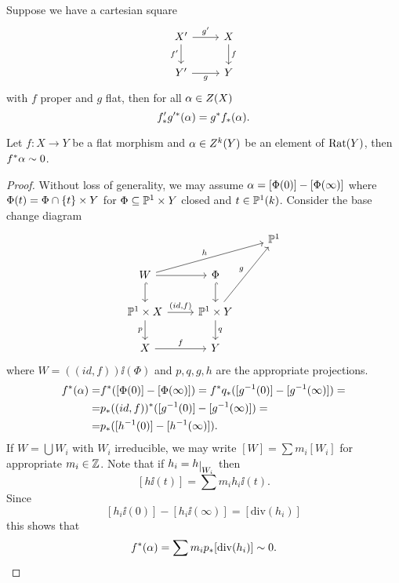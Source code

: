 \begin{proposition}[]
Suppose we have a cartesian square
\[\begin{tikzcd}
	{X'} & X \\
	{Y'} & Y
	\arrow["{g'}", from=1-1, to=1-2]
	\arrow["{f'}"', from=1-1, to=2-1]
	\arrow["f", from=1-2, to=2-2]
	\arrow["g"', from=2-1, to=2-2]
\end{tikzcd}\]
with $f$ proper and $g$ flat, then for all $\alpha\in Z(X)$
\[f_\ast'g'^\ast(\alpha)=g^\ast f_\ast(\alpha).\]
\end{proposition}


\begin{proposition}[]
Let $f:X\to Y$ be a flat morphism and $\alpha\in Z^k(Y)$ be an element of $\mathrm{Rat}(Y)$, then $f^\ast\alpha\sim 0$.
\end{proposition}
\begin{proof}
Without loss of generality, we may assume $\alpha=[\Phi(0)]-[\Phi(\infty)]$ where $\Phi(t)=\Phi\cap \left\{{t}\right\}\times Y$ for $\Phi\subseteq \mathbb{P}^1\times Y$ closed and $t\in \mathbb{P}^1(k)$.
Consider the base change diagram
\[\begin{tikzcd}
	&& {\Pj^1} \\
	W & \Phi \\
	{\Pj^1\times X} & {\Pj^1\times Y} \\
	X & Y
	\arrow["h", from=2-1, to=1-3]
	\arrow[from=2-1, to=2-2]
	\arrow[hook, from=2-1, to=3-1]
	\arrow[hook, from=2-2, to=3-2]
	\arrow["{(id,f)}", from=3-1, to=3-2]
	\arrow["p"', from=3-1, to=4-1]
	\arrow["g", from=3-2, to=1-3]
	\arrow["q", from=3-2, to=4-2]
	\arrow["f", from=4-1, to=4-2]
\end{tikzcd}\]
where $W=((id, f))\ii(\Phi)$ and $p,q,g,h$ are the appropriate projections.
\begin{align*}
f^\ast(\alpha)=&f^\ast([\Phi(0)]-[\Phi(\infty)])=f^\ast q_\ast([g^{-1}(0)]-[g^{-1}(\infty)])=\\
=&p_\ast((id, f))^\ast([g^{-1}(0)]-[g^{-1}(\infty)])=\\
=&p_\ast([h^{-1}(0)]-[h^{-1}(\infty)]).
\end{align*}
If $W=\bigcup W_i$ with $W_i$ irreducible, we may write $[W]=\sum m_i[W_i]$ for appropriate $m_i\in\mathbb{Z}$. Note that if $h_i=h\res{W_i}$ then
\[[h\ii(t)]=\sum m_i h_i\ii(t).\]
Since
\[[h_i\ii(0)]-[h_i\ii(\infty)]=[\mathrm{div}(h_i)]\]
this shows that
\[f^\ast(\alpha)=\sum m_i p_\ast[\mathrm{div}(h_i)]\sim 0.\]
\end{proof}


